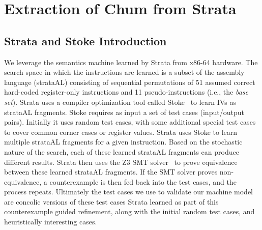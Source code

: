 \section{Extraction of Chum from Strata}\label{sec:strata->chum}

\subsection{Strata and Stoke Introduction}

We leverage the semantics machine learned by Strata \cite{heule2016} from x86-64 hardware.
The search space in which the instructions are learned is a subset of the assembly language (strataAL) consisting of sequential permutations of 51 assumed correct hard-coded register-only instructions and 11 pseudo-instructions (i.e., the \emph{base set}).
Strata uses a compiler optimization tool called Stoke~\cite{schkufza2013stochastic} to learn IVs as strataAL fragments. 
Stoke requires as input a set of test cases (input/output pairs).
Initially it uses random test cases, with some additional special test cases to cover common corner cases or register values. 
Strata uses Stoke to learn multiple strataAL fragments for a given instruction.
Based on the stochastic nature of the search, each of these learned strataAL fragments can produce different results. Strata then uses the Z3 SMT solver~\cite{de2008z3} to prove equivalence between these learned strataAL fragments. 
If the SMT solver proves non-equivalence, a counterexample is then fed back into the test cases, and the process repeats.
Ultimately the test cases we use to validate our machine model are concolic versions of these test cases Strata learned as part of this counterexample guided refinement, along with the initial random test cases, and heuristically interesting cases. 

